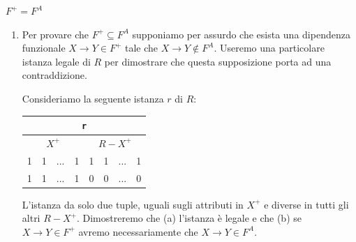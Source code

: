 \begin{Thm}{$F^+=F^A$}{}
\begin{demonstration}
\begin{enumerate}
\begin{enumerate}[label=(\alph*)]
                \item se $X\to Y$ è stata ottenuta applicando l'\textit{assioma dell'aumento} ad una dipendenza funzionale $V\to W \in F^A$, con $X=VZ$ e $Y=WZ$, ottenuta a sua volta applicando ricorsivamente gli assiomi di Armstrong un numero di volte minore o uguale a $i-1$ (quindi per l'ipotesi induttiva $V\to W \in F^+$); sarà quindi $X\to VZ$ e $Y\to WZ$, per qualche $Z\subseteq R$. Sia $r$ un'istanza legale di $R$ e siano $t_1$ e $t_2$ due tuple di $r$ tali che $t_1[X]=t_2[X]$; banalmente si ha che $t_1[VZ]=t_2[VZ]\implies t_1[V]=t_2[V]\land t_1[Z]=t_2[Z]$. Per l'ipotesi induttiva da $t_1[V]=t_2[V]$ segue $t_1[W]=t_2[W]$; da $t_1[W]=t_2[W]$ e $t_1[Z]=t_2[Z]$ segue $t_1[Y]=t_2[Y]$.

                \item se $X\to Y$ è stata ottenuta applicando l'\textit{assioma della transitività} a due dipendenze funzionali $X\to Z$ e $Z\to Y \in F^A$, ottenute a loro volta applicando ricorsivamente gli assiomi di Armstrong un numero di volte minore o uguale a $i-1$ (quindi per l'ipotesi induttiva $X\to Z$ e $Z\to Y \in F^+$). Sia $r$ un'istanza legale di $R$ e siano $t_1$ e $t_2$ due tuple di $r$ tali che $t_1[X]=t_2[X]$. Per l'ipotesi induttiva da $t_1[X]=t_2[X]$ segue $t_1[Z]=t_2[Z]$; da $t_1[Z]=t_2[Z]$, ancora per l'ipotesi induttiva segue $t_1[Y]=t_2[Y]$.
            \end{enumerate}

            \item Per provare che $F^+\subseteq F^A$ supponiamo per assurdo che esista una dipendenza funzionale $X\to Y\in F^+$ tale che $X\to Y\notin F^A$. Useremo una particolare istanza legale di $R$ per dimostrare che questa supposizione porta ad una contraddizione.

            Consideriamo la seguente istanza $r$ di $R$:
            \begin{center}
                \begin{tabular}{|c|c|c|c|c|c|c|c|}
                    \hline\multicolumn{8}{|c|}{\Verb|r|}\\
                    \hline\multicolumn{4}{|c|}{$X^+$} & \multicolumn{4}{|c|}{$R-X^+$}\\\hline
                    1 & 1 & ... & 1 & 1 & 1 & ... & 1\\
                    1 & 1 & ... & 1 & 0 & 0 & ... & 0\\\hline
                \end{tabular}
            \end{center}
            L'istanza da solo due tuple, uguali sugli attributi in $X^+$ e diverse in tutti gli altri $R-X^+$. Dimostreremo che (a) l'istanza è legale e che (b) se $X\to Y\in F^+$ avremo necessariamente che $X\to Y \in F^A$.


\end{enumerate}
\end{demonstration}
\end{Thm}
